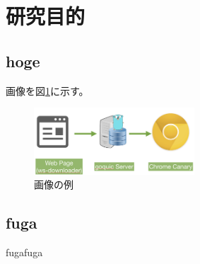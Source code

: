 \section{研究目的}

\subsection{hoge}
画像を図\ref{sample}に示す。

\begin{figure}[htbp]
    \begin{center}
        \includegraphics[width=6cm]{img/figure1.png}
        \caption{画像の例}
        \label{sample}
    \end{center}
\end{figure}
 
\subsection{fuga}
fugafuga

